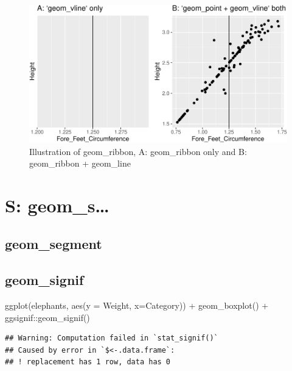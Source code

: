 \documentclass[
]{book}
\newenvironment{Shaded}{\begin{snugshade}}{\end{snugshade}}
\newcommand{\AttributeTok}[1]{\textcolor[rgb]{0.77,0.63,0.00}{#1}}
\newcommand{\FunctionTok}[1]{\textcolor[rgb]{0.00,0.00,0.00}{#1}}
\newcommand{\NormalTok}[1]{#1}
\newcommand{\SpecialCharTok}[1]{\textcolor[rgb]{0.00,0.00,0.00}{#1}}
\begin{document}
\begin{figure}
\centering
\includegraphics{Data-Visualisation-geom-Encyclopedia_files/figure-latex/unnamed-chunk-50-1.pdf}
\caption{\label{fig:unnamed-chunk-50}Illustration of geom\_ribbon, A: geom\_ribbon only and B: geom\_ribbon + geom\_line}
\end{figure}

\hypertarget{s-geom_s}{%
\chapter{S: geom\_s\ldots{}}\label{s-geom_s}}

\hypertarget{geom_segment}{%
\section{geom\_segment}\label{geom_segment}}

\hypertarget{geom_signif}{%
\section{geom\_signif}\label{geom_signif}}

\begin{Shaded}
\begin{Highlighting}[]
\FunctionTok{ggplot}\NormalTok{(elephants, }\FunctionTok{aes}\NormalTok{(}\AttributeTok{y =}\NormalTok{ Weight, }\AttributeTok{x=}\NormalTok{Category)) }\SpecialCharTok{+} \FunctionTok{geom\_boxplot}\NormalTok{() }\SpecialCharTok{+}\NormalTok{ ggsignif}\SpecialCharTok{::}\FunctionTok{geom\_signif}\NormalTok{()}
\end{Highlighting}
\end{Shaded}

\begin{verbatim}
## Warning: Computation failed in `stat_signif()`
## Caused by error in `$<-.data.frame`:
## ! replacement has 1 row, data has 0
\end{verbatim}
\end{document}
